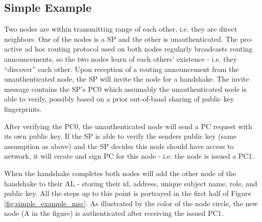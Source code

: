 \subsection{Simple Example}
Two nodes are within transmitting range of each other, i.e. they are direct
neighbors. One of the nodes is a \ac{SP} and the other is unauthenticated. The
pro-active ad hoc routing protocol used on both nodes regularly broadcasts
routing announcements, so the two nodes learn of each others' existence - i.e.
they ``discover'' each other. Upon reception of a routing announcement from the
unauthenticated node, the \ac{SP} will invite the node for a handshake. The
invite message contains the \ac{SP}'s \ac{PC0} which assumably the
unauthenticated node is able to verify, possibly based on a prior out-of-band
sharing of public key fingerprints.

After verifying the \ac{PC0}, the unauthenticated node will send a \ac{PC}
request with its own public key. If the \ac{SP} is able to verify the senders
public key (same assumption as above) and the \ac{SP} decides this node should
have access to network, it will create and sign \ac{PC} for this node - i.e. the
node is issued a \ac{PC1}.



When the handshake completes both nodes will add the other node of the handshake
to their \ac{AL} - storing their id, address, unique subject name, role, and
public key. All the steps up to this point is portrayed in the first half of
Figure \ref{fig:simple_example_msc}. As illustrated by the color of the node
circle, the new node (A in the figure) is authenticated after receiving the
issued \ac{PC1}.

